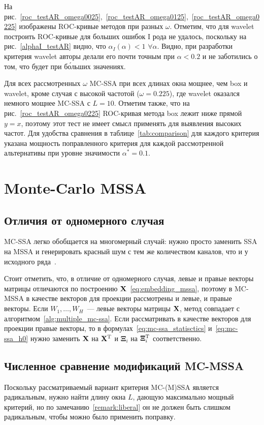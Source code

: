 \documentclass[specialist,
substylefile = spbu_report.rtx,
subf,href,colorlinks=true, 12pt]{disser}
\theoremstyle{definition}
\begin{document}
На рис.~\ref{roc_testAR_omega0025},~\ref{roc_testAR_omega0125},~\ref{roc_testAR_omega0225} изображены ROC-кривые методов при разных $\omega$. Отметим, что для wavelet построить ROC-кривые для больших ошибок I рода не удалось, поскольку на рис.~\ref{alphaI_testAR} видно, что $\alpha_I(\alpha) < 1$ $\forall \alpha$. Видно, при разработки критерия wavelet авторы делали его почти точным при $\alpha < 0.2$ и не заботились о том, что будет при б\'{о}льших значениях.

Для всех рассмотренных $\omega$ MC-SSA при всех длинах окна мощнее, чем box и wavelet, кроме случая с высокой частотой ($\omega=0.225$), где wavelet оказался немного мощнее MC-SSA с $L=10$. Отметим также, что на рис.~\ref{roc_testAR_omega0225} ROC-кривая метода box лежит ниже прямой $y=x$, поэтому этот тест не имеет смысл применять для выявления высоких частот. Для удобства сравнения в таблице~\ref{tab:comparison} для каждого критерия указана мощность поправленного критерия для каждой рассмотренной альтернативы при уровне значимости $\alpha^*=0.1$.

\section{Monte-Carlo MSSA}\label{sect:mc-mssa}
\subsection{Отличия от одномерного случая}
MC-SSA легко обобщается на многомерный случай: нужно просто заменить SSA на MSSA и генерировать красный шум с тем же количеством каналов, что и у исходного ряда~\cite{Groth2015}.

Стоит отметить, что, в отличие от одномерного случая, левые и правые векторы матрицы отличаются по построению $\mathbf{X}$~\eqref{eq:embedding_mssa}, поэтому в MC-MSSA в качестве векторов для проекции рассмотрены и левые, и правые векторы. Если $W_1,\ldots,W_H$~--- левые векторы матрицы $\mathbf{X}$, метод совпадает с алгоритмом~\ref{alg:multiple_mc-ssa}. Если рассматривать в качестве векторов для проекции правые векторы, то в формулах~\eqref{eq:mc-ssa_statisctics} и~\eqref{eq:mc-ssa_h0} нужно заменить $\mathbf{X}$ на $\mathbf{X}^{\mathrm{T}}$ и $\mathbf{\Xi}_i$ на $\mathbf{\Xi}_i^{\mathrm{T}}$ соответственно.

\subsection{Численное сравнение модификаций MC-MSSA}\label{sect:mc-mssa_numeric_comparison}
Поскольку рассматриваемый вариант критерия MC-(M)SSA является радикальным, нужно найти длину окна $L$, дающую максимально мощный критерий, но по замечанию~\ref{remark:liberal} он не должен быть слишком радикальным, чтобы можно было применить поправку.
\end{document}
